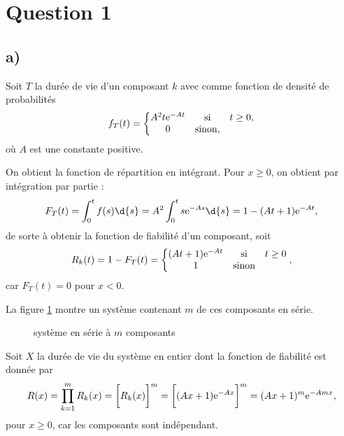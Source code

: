 \documentclass[11pt]{article}
\newcommand\e{%
    \ensuremath{%
        \mathrm{e}%
    }%
}
\begin{document}
\def\Sigle{MTH2302A}
\def\Cours{Probabilités et Statistique}
\def\Devoir{Devoir 2}
\def\logoscale{1}
\pagetitre

\section*{Question 1}
\subsection{a)}
Soit $T$ la durée de vie d'un composant $k$ avec comme fonction de densité
de probabilités
\begin{equation*}
    f_T(t)=\left\{
        \begin{matrix}
            A^2t\e^{-At} & \text{si} & t\geq 0,\\
            0            & \text{sinon},
        \end{matrix}
    \right.
\end{equation*}
où $A$ est une constante positive.

On obtient la fonction de répartition en intégrant. Pour $x\geq 0$, on
obtient par intégration par partie :
\begin{equation*}
    F_T(t)
    =\int_0^tf(s)\d{s}
    =A^2\int_0^ts\e^{-As}\d{s}
    =1-(At+1)\e^{-At},
\end{equation*}
de sorte à obtenir la fonction de fiabilité d'un composant, soit
\begin{equation*}
    R_k(t)
    =1-F_T(t)
    =\left\{
        \begin{matrix}
            (At+1)\e^{-At} & \text{si} & t\geq 0\\
            1              & \text{sinon}
        \end{matrix}
    \right.,
\end{equation*}
car $F_T(t)=0$ pour $x<0$.

La figure \ref{fig:sys_serie} montre un système contenant $m$ de
ces composants en série.
\begin{figure}[H]
    \centering
    
    \caption{système en série à $m$ composants}
    \label{fig:sys_serie}
\end{figure}

Soit $X$ la durée de vie du système en entier dont la fonction de fiabilité
est donnée par
\begin{equation*}
    R(x)
    =\prod_{k=1}^mR_k(x)
    =\bigg[R_k(x)\bigg]^m
    =\bigg[(Ax+1)\e^{-Ax}\bigg]^m
    =(Ax+1)^m\e^{-Amx},
\end{equation*}
pour $x\geq 0$, car les composants sont indépendant.
\end{document}
